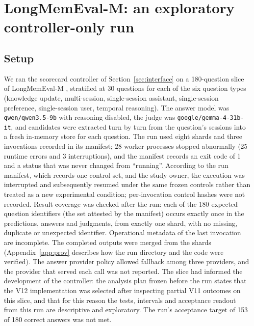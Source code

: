 \section{LongMemEval-M: an exploratory controller-only run}
\label{sec:lme}
\subsection{Setup}
We ran the scorecard controller of Section~\ref{sec:interface} on a 180-question slice of LongMemEval-M \citep{arxiv_2410_10813}, stratified at 30 questions for each of the six question types (knowledge update, multi-session, single-session assistant, single-session preference, single-session user, temporal reasoning). The answer model was \texttt{qwen/qwen3.5-9b} with reasoning disabled, the judge was \texttt{google/gemma-4-31b-it}, and candidates were extracted turn by turn from the question's sessions into a fresh in-memory store for each question. The run used eight shards and three invocations recorded in its manifest; 28 worker processes stopped abnormally (25 runtime errors and 3 interruptions), and the manifest records an exit code of 1 and a status that was never changed from ``running''. According to the run manifest, which records one control set, and the study owner, the execution was interrupted and subsequently resumed under the same frozen controls rather than treated as a new experimental condition; per-invocation control hashes were not recorded. Result coverage was checked after the run: each of the 180 expected question identifiers (the set attested by the manifest) occurs exactly once in the predictions, answers and judgments, from exactly one shard, with no missing, duplicate or unexpected identifier. Operational metadata of the last invocation are incomplete. The completed outputs were merged from the shards (Appendix~\ref{app:prov} describes how the run directory and the code were verified). The answer provider policy allowed fallback among three providers, and the provider that served each call was not reported. The slice had informed the development of the controller: the analysis plan frozen before the run states that the V12 implementation was selected after inspecting partial V11 outcomes on this slice, and that for this reason the tests, intervals and acceptance readout from this run are descriptive and exploratory. The run's acceptance target of 153 of 180 correct answers was not met.

